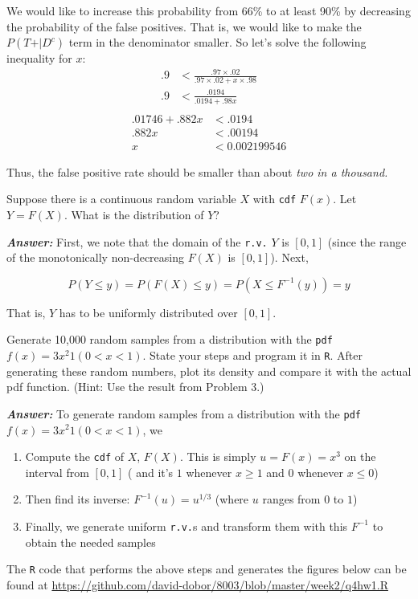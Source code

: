 \documentclass[12pt]{article}
\newenvironment{question}[2][Question]{\begin{trivlist}
\item[\hskip \labelsep {\bfseries #1}\hskip \labelsep {\bfseries #2.}]}{\end{trivlist}}
\begin{document}
 We would like to increase this probability from 66\% to at least 90\% by decreasing the probability of the false positives. That is, we would like to make the $P(T\text{+} | D^c)$ term in the denominator smaller. So let's solve the following inequality for $x$:
 \begin{align*}
 .9 &< \frac{.97 \times .02}{.97 \times .02 + x\times .98}\\
 .9 &< \frac{.0194} { .0194 +  .98x}\\
\end{align*}
 \begin{align*} 
.01746 + .882 x &<  .0194 \\
.882 x &< .00194 \\
x &< 0.002199546
\end{align*}

Thus, the false positive rate should be smaller than about \emph{two in a thousand.}


\bigskip
\bigskip
\begin{question}{2.3} Suppose there is a continuous random variable $X$ with \texttt{cdf} $F(x) $. Let $ Y = F(X) $. What is the distribution of $Y$? 
\end{question}

\textbf{\color{TealBlue}\emph{Answer:} } 
First, we note that the domain of the \texttt{r.v.} $Y$ is $[0, 1]$ (since the range of the monotonically non-decreasing $F(X)$ is $[0, 1]$).  Next, 


$$
P ( Y \leq y ) = P( F(X) \leq y) = P( X \leq F^{-1}(y) ) = y
$$

That is, $Y$ has to be uniformly distributed over $[0, 1]$. %


\bigskip
\bigskip
\begin{question}{2.4} 
Generate 10,000 random samples from a distribution with the \texttt{pdf} $f(x) = 3 x^2 1(0 < x < 1) $. State your steps and program it in \texttt{R}. After generating these random numbers, plot its density and compare it with the actual pdf function. (Hint: Use the result from Problem 3.)

\end{question}


\textbf{\color{TealBlue}\emph{Answer:} } To generate random samples from a distribution with the \texttt{pdf} $f(x) = 3 x^2 1(0 < x < 1) $, we 

\begin{enumerate}
\item Compute the \texttt{cdf} of $X$, $F(X)$. This is simply $u = F(x) = x^3$ on the interval from $[0,1]$ ( and it's $1$ whenever $x \geq 1$ and $0$ whenever $x \leq 0$)
\item Then find its inverse: $F^{-1}(u) = u^{1/3}$ (where $u$ ranges from $0$ to $1$)
\item Finally, we generate uniform \texttt{r.v.}s and transform them with this $F^{-1}$ to obtain the needed samples
\end{enumerate} 
 The \texttt{R} code that performs the above steps and generates the figures below can be found at \url{https://github.com/david-dobor/8003/blob/master/week2/q4hw1.R} 
 
\end{document}
